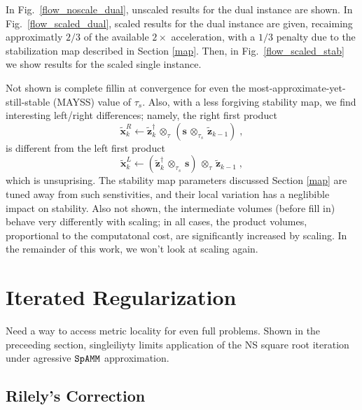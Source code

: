 \documentclass[letterpaper,twocolumn,amsmath,amsfont,amssymb,english,aps,jcp,preprintnumbers,groupaddress,nofootinbib,tightenlines,floatfix]{revtex4}
\newcommand{\mat}[1]{\boldsymbol{#1}}
\newcommand{\ot}{  {\scriptstyle \otimes}_{ \tau } }
\newcommand{\ots}{ {\scriptstyle \otimes}_{ \! \tau_s } }
\theoremstyle{plain}
\theoremstyle{remark}
\theoremstyle{plain}
\begin{document}
In Fig.~\ref{flow_noscale_dual}, unscaled results for the dual instance are shown.  In Fig.~\ref{flow_scaled_dual}, scaled results for the
dual instance are given, recaiming approximatly $2/3$ of the available $2 \times$ acceleration, with a $1/3$ penalty due to the
stabilization map described in Section \ref{map}. Then, in Fig.~\ref{flow_scaled_stab} we show results for the scaled single instance. 

Not shown is complete fillin at convergence for even the most-approximate-yet-still-stable (MAYSS) value of $\tau_s$.  
Also, with a less forgiving stability map, we find interesting 
left/right differences;  namely, the right first product 
\begin{equation} 
\widetilde{\mat{x}}^R_k \leftarrow \widetilde{\mat{z}}^\dagger_{k} \, \ot  \, \left( \mat{s} \,  \ots \, \widetilde{\mat{z}}_{k-1}  \right) \; ,
\end{equation}
is  different from the left first product 
\begin{equation} 
\widetilde{\mat{x}}^L_k \leftarrow \left(  \widetilde{\mat{z}}^\dagger_{k} \, \ots \, \mat{s} \right) \,  \ot  \, \widetilde{\mat{z}}_{k-1} \; ,
\end{equation}
which is unsuprising. The stability map parameters discussed Section \ref{map} 
are tuned away from such senstivities, and their local variation has a neglibible impact on stability.  
Also not shown, the intermediate volumes (before fill in) behave very differently with scaling; in all cases, the product volumes,
proportional to the computatonal cost, are significantly increased by scaling.  In the remainder of this work, we won't look at scaling again.

\section{Iterated Regularization}\label{regularization}

Need a way to access metric locality for even full problems. 
Shown in the preceeding section, singleiliyty limits application of the NS square root iteration under 
agressive $\tt SpAMM$ approximation.  

\subsection{Rilely's Correction}
\end{document}
